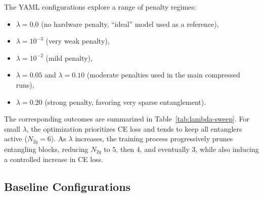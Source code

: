 \documentclass[conference]{IEEEtran}
\begin{document}
The YAML configurations explore a range of penalty regimes:
\begin{itemize}
    \item $\lambda = 0.0$ (no hardware penalty, ``ideal'' model used as a reference),
    \item $\lambda = 10^{-3}$ (very weak penalty),
    \item $\lambda = 10^{-2}$ (mild penalty),
    \item $\lambda = 0.05$ and $\lambda = 0.10$ (moderate penalties used in the main compressed runs),
    \item $\lambda = 0.20$ (strong penalty, favoring very sparse entanglement).
\end{itemize}
The corresponding outcomes are summarized in Table~\ref{tab:lambda-sweep}. For small $\lambda$, the optimization prioritizes CE loss and tends to keep all entanglers active ($N_{2q}=6$). As $\lambda$ increases, the training process progressively prunes entangling blocks, reducing $N_{2q}$ to $5$, then $4$, and eventually $3$, while also inducing a controlled increase in CE loss.

\subsection{Baseline Configurations}
\end{document}
